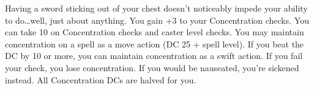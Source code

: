 {Having a sword sticking out of your chest doesn't noticeably impede your ability to do\ldots well, just about anything.}
{You gain +3 to your Concentration checks.}
{You can take 10 on Concentration checks and caster level checks.}
{You may maintain concentration on a spell as a move action (DC 25 + spell level). If you beat the DC by 10 or more, you can maintain concentration as a swift action. If you fail your check, you lose concentration.}
{If you would be nauseated, you're sickened instead.}
{All Concentration DCs are halved for you.}
